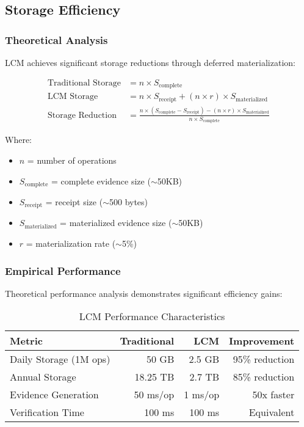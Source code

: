 \documentclass[12pt,a4paper]{article}
\begin{document}
\subsection{Storage Efficiency}

\subsubsection{Theoretical Analysis}

LCM achieves significant storage reductions through deferred materialization:

\begin{align}
\text{Traditional Storage} &= n \times S_{\text{complete}} \\
\text{LCM Storage} &= n \times S_{\text{receipt}} + (n \times r) \times S_{\text{materialized}} \\
\text{Storage Reduction} &= \frac{n \times (S_{\text{complete}} - S_{\text{receipt}}) - (n \times r) \times S_{\text{materialized}}}{n \times S_{\text{complete}}}
\end{align}

Where:
\begin{itemize}
\item $n$ = number of operations
\item $S_{\text{complete}}$ = complete evidence size ($\sim$50KB)
\item $S_{\text{receipt}}$ = receipt size ($\sim$500 bytes)  
\item $S_{\text{materialized}}$ = materialized evidence size ($\sim$50KB)
\item $r$ = materialization rate ($\sim$5\%)
\end{itemize}

\subsubsection{Empirical Performance}

Theoretical performance analysis demonstrates significant efficiency gains:

\begin{table}[H]
\centering
\begin{tabular}{lrrr}
\toprule
\textbf{Metric} & \textbf{Traditional} & \textbf{LCM} & \textbf{Improvement} \\
\midrule
Daily Storage (1M ops) & 50 GB & 2.5 GB & 95\% reduction \\
Annual Storage & 18.25 TB & 2.7 TB & 85\% reduction \\
Evidence Generation & 50 ms/op & 1 ms/op & 50x faster \\
Verification Time & 100 ms & 100 ms & Equivalent \\
\bottomrule
\end{tabular}
\caption{LCM Performance Characteristics}
\label{tab:performance}
\end{table}
\end{document}
